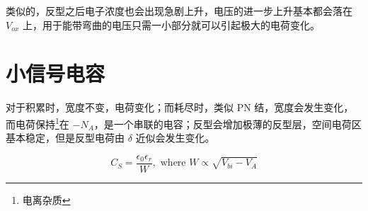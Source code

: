 \documentclass[cn,11pt,chinese,black,simple]{../elegantbook}
\begin{document}
类似的，反型之后电子浓度也会出现急剧上升，电压的进一步上升基本都会落在 \(V_{ox}\) 上，用于能带弯曲的电压只需一小部分就可以引起极大的电荷变化。

\section{小信号电容}

对于积累时，宽度不变，电荷变化；而耗尽时，类似 PN 结，宽度会发生变化，而电荷保持\footnote{电离杂质}在 \(-N_A\)，是一个串联的电容；反型会增加极薄的反型层，空间电荷区基本稳定，但是反型电荷由 \(\delta\) 近似会发生变化。

\[C_S = \frac{\epsilon_0 \epsilon_r}{W}, \text{ where } W \propto \sqrt{V_{bi} - V_A} \]



\let\chapname\undefined
\ifx\mainclass\undefined
\end{document}
